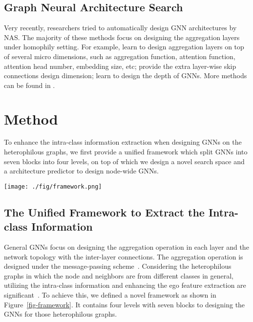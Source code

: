 \documentclass[sigconf]{acmart}
\begin{document}
\subsection{Graph Neural Architecture Search}
Very recently, researchers tried to automatically design GNN architectures by NAS. The majority of these methods focus on designing the aggregation layers under homophily setting.
For example, \cite{gao2019graphnas,zhou2019auto,yoon2020autonomous,li2021one} learn to design aggregation layers on top of several micro dimensions, such as aggregation function, attention function, attention head number, embedding size, etc; \cite{zhao2021search,zhao2020simplifying,li2020autograph,wei2022designing} provide the extra layer-wise skip connections design dimension; \cite{cai2021rethinking,lai2020policy,wang2022graph} learn to design the depth of GNNs. More methods can be found in \cite{zhang2021automated}.




\section{Method}


To enhance the intra-class information extraction when designing GNNs on the heterophilous graphs, we first provide a unified framework which split GNNs into seven blocks into four levels, on top of which we design a novel search space and a architecture predictor to design node-wide GNNs.




\begin{figure*}
	\centering
	\texttt{[image: ./fig/framework.png]}
	\caption{An overview of the proposed framework. (a) Each GNN layer contains two blocks in the Neighbor-level (as shown in (b)) and two blocks in the Message-level (as shown in (c)). (d-e) The designed Residual-merge and Inter-layer blocks in the Layer-level. (f) The designed output-merge block in the Network-level.
	}
	\label{fig-framework}
\end{figure*}


\subsection{The Unified Framework to Extract the Intra-class Information}	
General GNNs focus on designing the aggregation operation in each layer and the network topology with the inter-layer connections. The aggregation operation is designed under the message-passing scheme~\cite{gilmer2017neural}. 
Considering the heterophilous graphs in which the node and neighbors are from different classes in general, utilizing the intra-class information and enhancing the ego feature extraction are significant~\cite{zhu2020beyond,bo2021beyond,suresh2021breaking}. 
To achieve this, we defined a novel framework as shown in Figure~\ref{fig-framework}. 
It contains four levels with seven blocks to designing the GNNs for those heterophilous graphs.
\end{document}
